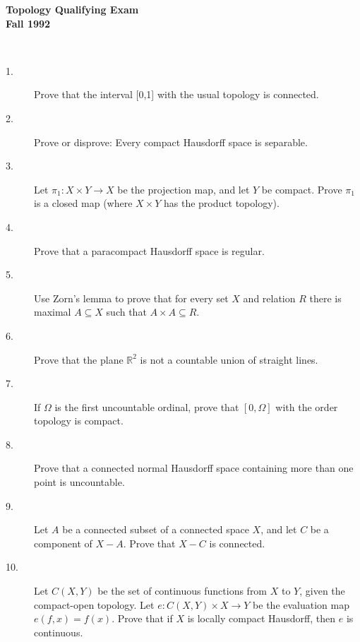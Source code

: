 \documentclass{article}
\def\R{\mathbb R}
\begin{document}






\begin{center}\begin{LARGE}
{\bf Topology Qualifying Exam}\\ 
{\bf Fall 1992}\\ \end{LARGE}
\end{center}
\vspace{0.1in}
\noindent\hrulefill\\

\begin{description}
\item[1.]
Prove that the interval [0,1] with the usual topology is connected.

\item[2.]
Prove or disprove: Every compact Hausdorff space is separable.

\item[3.]
Let $\pi_1 : X \times Y \to X$ be the projection map, and let $Y$ be
compact. Prove $\pi_1$ is a closed map (where $X \times Y$ has the product
topology).

\item[4.]
Prove that a paracompact Hausdorff space is regular.

\item[5.]
Use Zorn's lemma to prove that for every set $X$ and relation $R$ there is
maximal $A \subseteq X$ such that $A \times A \subseteq R$.

\item[6.]
Prove that the plane $\R^2$ is not a countable union of straight lines.

\item[7.]
If $\Omega$ is the first uncountable ordinal, prove that $[0, \Omega]$
with the order topology is compact.

\item[8.]
Prove that a connected normal Hausdorff space containing more than one point
is uncountable.

\item[9.]
Let $A$ be a connected subset of a connected space $X$, and let $C$ be a
component of $X-A$. Prove that $X-C$ is connected.

\item[10.]
Let $C(X,Y)$ be the set of continuous functions from $X$ to $Y$, given the
compact-open topology. Let $e : C(X,Y) \times X \to Y$ be the evaluation
map $e(f,x) = f(x)$. Prove that if $X$ is locally compact Hausdorff, then
$e$ is continuous.


\end{description}
\end{document}
